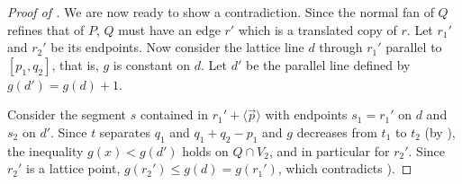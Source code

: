 \documentclass{amsart}
\theoremstyle{plain}
\theoremstyle{definition}
\renewcommand{\vec}[1]{\overrightarrow#1}
\newcommand{\vecline}[1]{\langle \vec #1 \rangle}
\begin{document}
\begin{proof}[Proof of ]
We are now ready to show a contradiction. Since the normal fan of $Q$ refines that of $P$, $Q$ must have an edge $r'$ which is a translated copy of $r$. Let $r_1'$ and $r_2'$ be its endpoints. Now consider the lattice line $d$ through $r_1'$ parallel to  $[p_1, q_2]$, that is, $g$ is constant on $d$. Let $d'$ be the parallel line defined by $g(d')=g(d)+1$. 


Consider the segment $s$ contained in $r_1' + \vecline p$ with endpoints $s_1=r_1'$ on $d$ and $s_2$ on $d'$.  
Since $t$ separates $q_1$ and $q_1+q_2-p_1$ and $g$ decreases from $t_1$ to $t_2$ (by ), the inequality $g(x)< g(d')$ holds on $Q\cap V_2$,
and in particular for $r_2'$. Since $r_2'$ is a lattice point, $g(r_2')\leq g(d)= g(r_1')$, which contradicts ).
\end{proof}
\end{document}
